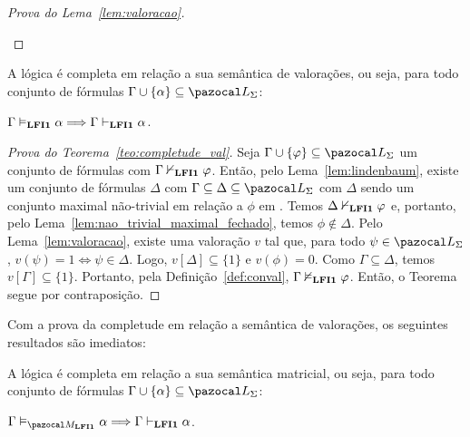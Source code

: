 \begin{proof}[Prova do Lema~\ref{lem:valoracao}]
\begin{provaporcasos}
\begin{adjustwidth}{1cm}{}
                    \end{adjustwidth}

        \end{provaporcasos}


    \end{proof}
    

    \begin{teorema}\label{teo:completude_val}
        A lógica {\normalfont\lfium{}} é completa em relação a sua semântica de valorações, ou seja, para todo conjunto de fórmulas $\Gamma \cup \{\alpha\} \subseteq \ling{}$:

        \centering
        {\normalfont{} $\Gamma \vDash_{{\normalfont\textbf{LFI1}}{}} \alpha \Longrightarrow \Gamma \vdash_{{\normalfont\textbf{LFI1}}{}} \alpha$.}
    \end{teorema}

    \begin{proof}[Prova do Teorema~\ref{teo:completude_val}]
        Seja $\Gamma \cup \{\phi\} \subseteq \ling{}$ um conjunto de fórmulas com $\Gamma \nvdash_{{\normalfont\textbf{LFI1}}{}} \varphi$. Então, pelo Lema~\ref{lem:lindenbaum}, existe um conjunto de fórmulas $\Delta$ com $\Gamma \subseteq \Delta \subseteq \ling{}$ com $\Delta$ sendo um conjunto maximal não-trivial em relação a $\phi$ em \lfium{}. Temos $\Delta \nvdash_{{\normalfont\textbf{LFI1}}{}} \varphi$ e, portanto, pelo Lema~\ref{lem:nao_trivial_maximal_fechado}, temos $\phi \not \in \Delta$. Pelo Lema~\ref{lem:valoracao}, existe uma valoração $v$ tal que, para todo $\psi \in \ling{}$, $v(\psi) = 1 \Longleftrightarrow \psi \in \Delta$. Logo, $v[\Delta] \subseteq \{1\}$ e $v(\phi) = 0$. Como $\Gamma \subseteq \Delta$, temos $v[\Gamma] \subseteq \{1\}$. Portanto, pela Definição~\ref{def:conval}, $\Gamma \nvDash_{{\normalfont\textbf{LFI1}}{}} \varphi$. Então, o Teorema segue por contraposição.

    \end{proof}

    Com a prova da completude em relação a semântica de valorações, os seguintes resultados são imediatos:

    \begin{corolario}\label{teo:completude_mat}
        A lógica {\normalfont\lfium{}} é completa em relação a sua semântica matricial, ou seja, para todo conjunto de fórmulas $\Gamma \cup \{\alpha\} \subseteq \ling{}$:

        \centering
        {\normalfont{} $\Gamma \conmat \alpha \Longrightarrow \Gamma \conhil \alpha$.}

    \end{corolario}

